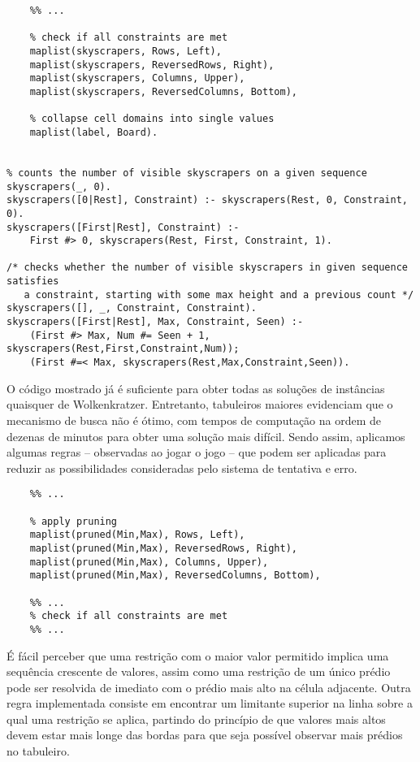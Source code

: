 \begin{verbatim}
    %% ...

    % check if all constraints are met
    maplist(skyscrapers, Rows, Left),
    maplist(skyscrapers, ReversedRows, Right),
    maplist(skyscrapers, Columns, Upper),
    maplist(skyscrapers, ReversedColumns, Bottom),

    % collapse cell domains into single values
    maplist(label, Board).


% counts the number of visible skyscrapers on a given sequence
skyscrapers(_, 0).
skyscrapers([0|Rest], Constraint) :- skyscrapers(Rest, 0, Constraint, 0).
skyscrapers([First|Rest], Constraint) :-
    First #> 0, skyscrapers(Rest, First, Constraint, 1).

/* checks whether the number of visible skyscrapers in given sequence satisfies
   a constraint, starting with some max height and a previous count */
skyscrapers([], _, Constraint, Constraint).
skyscrapers([First|Rest], Max, Constraint, Seen) :-
    (First #> Max, Num #= Seen + 1, skyscrapers(Rest,First,Constraint,Num));
    (First #=< Max, skyscrapers(Rest,Max,Constraint,Seen)).
\end{verbatim}

O código mostrado já é suficiente para obter todas as soluções de instâncias quaisquer de Wolkenkratzer.
Entretanto, tabuleiros maiores evidenciam que o mecanismo de busca não é ótimo, com tempos de computação na ordem de dezenas de minutos para obter uma solução mais difícil.
Sendo assim, aplicamos algumas regras -- observadas ao jogar o jogo -- que podem ser aplicadas para reduzir as possibilidades consideradas pelo sistema de tentativa e erro.

\begin{verbatim}
    %% ...
    
    % apply pruning
    maplist(pruned(Min,Max), Rows, Left),
    maplist(pruned(Min,Max), ReversedRows, Right),
    maplist(pruned(Min,Max), Columns, Upper),
    maplist(pruned(Min,Max), ReversedColumns, Bottom),
    
    %% ...
    % check if all constraints are met
    %% ...
\end{verbatim}

É fácil perceber que uma restrição com o maior valor permitido implica uma sequência crescente de valores, assim como uma restrição de um único prédio pode ser resolvida de imediato com o prédio mais alto na célula adjacente.
Outra regra implementada consiste em encontrar um limitante superior na linha sobre a qual uma restrição se aplica, partindo do princípio de que valores mais altos devem estar mais longe das bordas para que seja possível observar mais prédios no tabuleiro.

